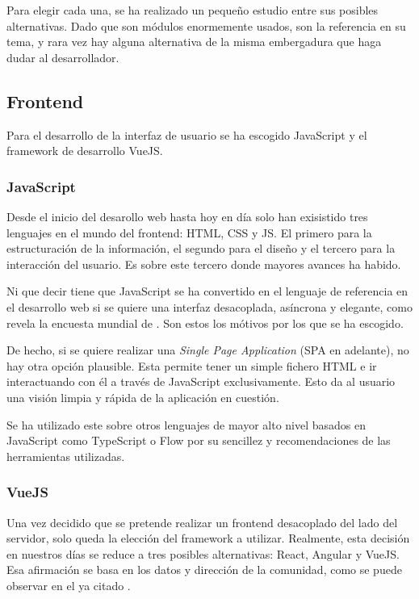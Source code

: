 Para elegir cada una, se ha realizado un pequeño estudio entre sus posibles alternativas. Dado que son módulos enormemente usados, son la referencia en su tema, y rara vez hay alguna alternativa de la misma embergadura que haga dudar al desarrollador.

\subsection{Frontend}
Para el desarrollo de la interfaz de usuario se ha escogido JavaScript y el framework de desarrollo VueJS.

\subsubsection{JavaScript}
Desde el inicio del desarollo web hasta hoy en día solo han exisistido tres lenguajes en el mundo del frontend: HTML, CSS y JS. El primero para la estructuración de la información, el segundo para el diseño y el tercero para la interacción del usuario. Es sobre este tercero donde mayores avances ha habido.

Ni que decir tiene que JavaScript se ha convertido en el lenguaje de referencia en el desarrollo web si se quiere una interfaz desacoplada, asíncrona y elegante, como revela la encuesta mundial de . Son estos los mótivos por los que se ha escogido.

De hecho, si se quiere realizar una \textit{Single Page Application} (SPA en adelante), no hay otra opción plausible. Esta permite tener un simple fichero HTML e ir interactuando con él a través de JavaScript exclusivamente. Esto da al usuario una visión limpia y rápida de la aplicación en cuestión.

Se ha utilizado este sobre otros lenguajes de mayor alto nivel basados en JavaScript como TypeScript o Flow por su sencillez y recomendaciones de las herramientas utilizadas.

\subsubsection{VueJS}

Una vez decidido que se pretende realizar un frontend desacoplado del lado del servidor, solo queda la elección del framework a utilizar. Realmente, esta decisión en nuestros días se reduce a tres posibles alternativas: React, Angular y VueJS. Esa afirmación se basa en los datos y dirección de la comunidad, como se puede observar en el ya citado .

